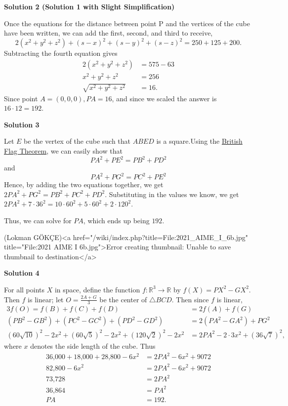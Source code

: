 \begin{enumerate}
\textbf{Solution 2 (Solution 1 with Slight Simplification)}

Once the equations for the distance between point P and the vertices of the cube have been written, we can add the first, second, and third to receive, 
 \[2(x^2 + y^2 + z^2) + (s-x)^2 + (s-y)^2 + (s-z)^2 = 250 + 125 + 200.\] Subtracting the fourth equation gives
 \begin{align*} 2(x^2 + y^2 + z^2) &= 575 - 63 \\ x^2 + y^2 + z^2 &= 256 \\ \sqrt{x^2 + y^2 + z^2} &= 16. \end{align*}
Since point $A = (0,0,0), PA = 16$, and since we scaled the answer is $16 \cdot 12 = \boxed{192}$.

 



\textbf{Solution 3}

Let $E$ be the vertex of the cube such that $ABED$ is a square.Using the \href{https://artofproblemsolving.com/wiki/index.php?title=British\_Flag\_Theorem}{British Flag Theorem}, we can easily show that
 \[PA^2 + PE^2 = PB^2 + PD^2\]and
 \[PA^2 + PG^2 = PC^2 + PE^2\]Hence, by adding the two equations together, we get $2PA^2 + PG^2 = PB^2 + PC^2 + PD^2$. Substituting in the values we know, we get $2PA^2 + 7\cdot 36^2 =10\cdot60^2 + 5\cdot 60^2 + 2\cdot 120^2$.

 Thus, we can solve for $PA$, which ends up being $\boxed{192}$.

 (Lokman GÖKÇE)<a href="/wiki/index.php?title=File:2021\_AIME\_I\_6b.jpg" title="File:2021 AIME I 6b.jpg">Error creating thumbnail: Unable to save thumbnail to destination</a>




\textbf{Solution 4}

For all points $X$ in space, define the function $f:\mathbb{R}^{3}\rightarrow\mathbb{R}$ by $f(X)=PX^{2}-GX^{2}$. Then $f$ is linear; let $O=\frac{2A+G}{3}$ be the center of $\triangle BCD$. Then since $f$ is linear,
 \begin{align*} 3f(O)=f(B)+f(C)+f(D)&=2f(A)+f(G) \\  \left(PB^{2}-GB^{2}\right)+\left(PC^{2}-GC^{2}\right)+\left(PD^{2}-GD^{2}\right)&=2\left(PA^{2}-GA^{2}\right)+PG^{2} \\ \left(60\sqrt{10}\right)^{2}-2x^{2}+\left(60\sqrt{5}\right)^{2}-2x^{2}+\left(120\sqrt{2}\right)^{2}-2x^{2}&=2PA^{2}-2\cdot 3x^{2}+\left(36\sqrt{7}\right)^{2}, \end{align*}
where $x$ denotes the side length of the cube. Thus
 \begin{align*}  36\text{,}000+18\text{,}000+28\text{,}800-6x^{2}&=2PA^{2}-6x^{2}+9072 \\  82\text{,}800-6x^{2}&=2PA^{2}-6x^{2}+9072 \\  73\text{,}728&=2PA^{2} \\  36\text{,}864&=PA^{2} \\  PA&=\boxed{192}. \end{align*}





\end{enumerate}
